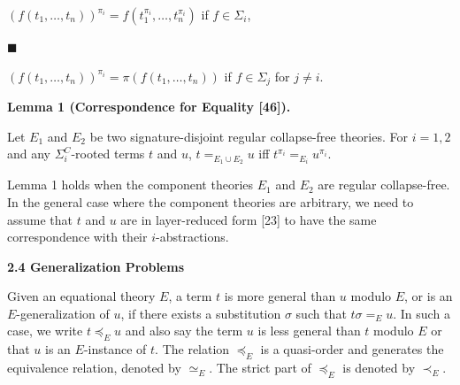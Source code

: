 \documentclass[10pt,a4paper]{amsart}
\begin{document}
$(f(t_{1},\dots,t_{n}))^{\pi_{i}}=f(t_{1}^{\pi_{i}},\dots,t_{n}^{\pi_{i}})$ if $f\in\Sigma_{i}$,\par
 
 
 
\par\noindent  $\blacksquare$ 
 
$(f(t_{1},\dots,t_{n}))^{\pi_{i}}=\pi(f(t_{1},\dots,t_{n}))$ if $f\in\Sigma_{j}$ for $j\neq i$.\par
 
 
  
 
 
\par\medskip\noindent\textbf{Lemma 1 (Correspondence for Equality [46]).}\par
 
 
Let $E_{1}$ and $E_{2}$ be two signature-disjoint regular collapse-free theories. For $i=1,2$ and any ${\Sigma}^{C}_{i}$-rooted terms $t$ and $u$, $t=_{E_{1}\cup E_{2}}u$ iff $t^{\pi_{i}}=_{E_{i}}u^{\pi_{i}}$.\par
 
 
 
 
Lemma 1 holds when the component theories $E_{1}$ and $E_{2}$ are regular collapse-free. In the general case where the component theories are arbitrary, we need to assume that $t$ and $u$ are in layer-reduced form [23] to have the same correspondence with their $i$-abstractions.\par
 
 
 
 
\par\medskip\noindent\textbf{2.4 Generalization Problems}\par
 
 
Given an equational theory $E$, a term $t$ is more general than $u$ modulo $E$, or is an $E$-generalization of $u$, if there exists a substitution $\sigma$ such that $t\sigma=_{E}u$. In such a case, we write $t\preceq_{E}u$ and also say the term $u$ is less general than $t$ modulo $E$ or that $u$ is an $E$-instance of $t$. The relation $\preceq_{E}$ is a quasi-order and generates the equivalence relation, denoted by $\simeq_{E}$. The strict part of $\preceq_{E}$ is denoted by $\prec_{E}$.\par
 
\end{document}
